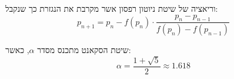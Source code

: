 \documentclass{tstextbook}
\begin{document}
\begin{proposition}
וריאציה של שיטת ניוטון רפסון אשר מקרבת את הנגזרת כך שנקבל:
$$p_{n+1}=p_{n}-f(p_{n})\cdot{\frac{p_{n}-p_{n-1}}{f(p_{n})-f(p_{n-1})}}$$

\end{proposition}
\begin{proposition}
שיטת הסקאנט מתכנס מסדר \(\alpha\), כאשר:
$$\alpha={\frac{1+{\sqrt{5}}}{2}}\approx1.618$$

\end{proposition}
\end{document}
